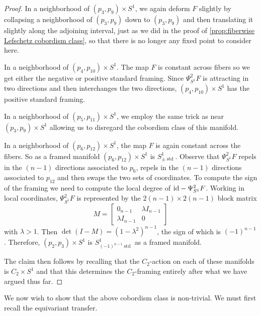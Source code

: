 \documentclass[11pt]{amsart}
\newcommand{\id}{\textup{id}}
\DeclareMathOperator{\std}{std}
\theoremstyle{plain}   %
\theoremstyle{definition}
\theoremstyle{remark}
\numberwithin{equation}{section}
\begin{document}
\begin{proof}
In a neighborhood of $(p_3,p_9)\times S^1$, we again deform $F$ slightly by collapsing a neighborhood of $(p_3,p_9)$ down to $(p_3,p_9)$ and then translating it slightly along the adjoining interval, just as we did in the proof of \cref{prop:fiberwise Lefschetz cobordism class}, so that there is no longer any fixed point to consider here. 

In a neighborhood of $(p_4,p_{10})\times S^1$. The map $F$ is constant across fibers so we get either the negative or positive standard framing. Since $\Psi^{2}_{S^1}F$ is attracting in two directions and then interchanges the two directions, $(p_4,p_{10})\times S^1$ has the positive standard framing. 

In a neighborhood of $(p_5,p_{11})\times S^1$, we employ the same trick as near $(p_3,p_9)\times S^1$ allowing us to disregard the cobordism class of this manifold. 

In a neighborhood of $(p_6,p_{12})\times S^1$, the map $F$ is again constant across the fibers. So as a framed manifold $(p_6,p_{12})\times S^1$ is $S^1_{\pm\std}$. Observe that $\Psi^{2}_{S^1}F$ repels in the $(n-1)$ directions associated to $p_6$, repels in the $(n-1)$ directions associated to $p_{12}$ and then swaps the two sets of coordinates. To compute the sign of the framing we need to compute the local degree of $\id-\Psi_{S^1}^2F$. Working in local coordinates, $\Psi_{S^1}^2F$ is represented by the $2(n-1)\times 2(n-1)$ block matrix
\[
M=\left[ 
\begin{array}{c|c}
0_{n-1} & \lambda I_{n-1}\\ \hline
\lambda I_{n-1} & 0
\end{array}
\right]
\]
with $\lambda>1$. Then $\det(I-M)=(1-\lambda^2)^{n-1}$, the sign of which is $(-1)^{n-1}$. Therefore, $(p_2,p_3)\times S^1$ is $S^1_{(-1)^{n-1}\std}$ as a framed manifold. 

The claim then follows by recalling that the $C_2$-action on each of these manifolds is $C_2\times S^1$ and that this determines the $C_2$-framing entirely after what we have argued thus far.
\end{proof}

We now wish to show that the above cobordism class is non-trivial. We must first recall the equivariant transfer. 
\end{document}
